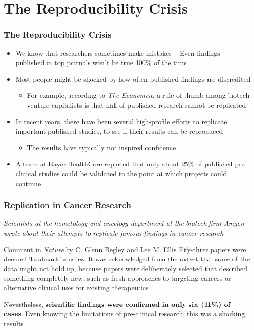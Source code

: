 \documentclass[10pt, block=fill]{beamer}
\begin{document}
\section{The Reproducibility Crisis}

\begin{frame}
  \frametitle{The Reproducibility Crisis}

  \begin{itemize}
    \item We know that researchers sometimes make mistakes -- Even findings published in top journals won't be true 100\% of the time
    \item Most people might be shocked by how often published findings are discredited
    \begin{itemize}
      \item For example, according to \textit{The Economist}, a rule of thumb among biotech venture-capitalists is that half of published research cannot be replicated
    \end{itemize}
    \item In recent years, there have been several high-profile efforts to replicate important published studies, to see if their results can be reproduced
    \begin{itemize}
      \item The results have typically not inspired confidence
    \end{itemize}
    \item A team at Bayer HealthCare reported that only about 25\% of published pre-clinical studies could be validated to the point at which projects could continue
  \end{itemize}
  
\end{frame}


\begin{frame}
  \frametitle{Replication in Cancer Research}

  \textit{Scientists at the hematology and oncology department at the biotech firm Amgen wrote about their attempts to replicate famous findings in cancer research}
  
  \begin{block}{Comment in \textit{Nature} by C. Glenn Begley and Lee M. Ellis}
  Fify-three papers were deemed 'landmark' studies. It was acknowledged from the outset that some of the data might not hold up, because papers were deliberately selected that described something completely new, such as fresh approaches to targeting cancers or alternative clinical uses for existing therapeutics \par
  Nevertheless, \textbf{scientific findings were confirmed in only six (11\%) of cases}. Even knowing the limitations of pre-clinical research, this was a shocking results
  \end{block}

\end{frame}
\end{document}
